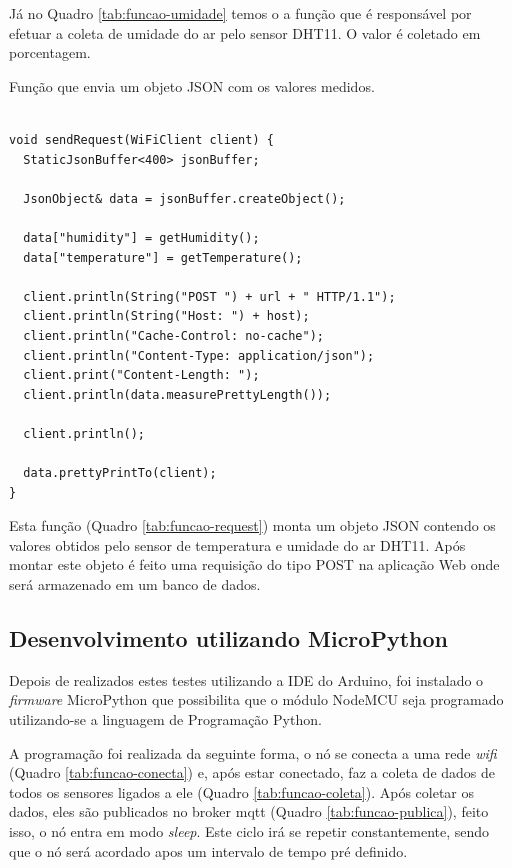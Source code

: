 Já no Quadro \ref{tab:funcao-umidade} temos o a função que é responsável por efetuar a coleta de umidade do ar pelo sensor DHT11. O valor é coletado em porcentagem.

\begin{quadro}[H]
\centering
\caption{Função que envia um objeto JSON com os valores medidos.}
\vspace{-\baselineskip}
\begin{verbatim}

void sendRequest(WiFiClient client) {
  StaticJsonBuffer<400> jsonBuffer;

  JsonObject& data = jsonBuffer.createObject();

  data["humidity"] = getHumidity();
  data["temperature"] = getTemperature();

  client.println(String("POST ") + url + " HTTP/1.1");
  client.println(String("Host: ") + host);
  client.println("Cache-Control: no-cache");
  client.println("Content-Type: application/json");
  client.print("Content-Length: ");
  client.println(data.measurePrettyLength());

  client.println();

  data.prettyPrintTo(client);
}
\end{verbatim}
\vspace{-1.2cm}
\label{tab:funcao-request}
\end{quadro}

Esta função (Quadro \ref{tab:funcao-request}) monta um objeto JSON contendo os valores obtidos pelo sensor de temperatura e umidade do ar DHT11. Após montar este objeto é feito uma requisição do tipo POST na aplicação Web onde será armazenado em um banco de dados.

\subsection{Desenvolvimento utilizando MicroPython}

Depois de realizados estes testes utilizando a IDE do Arduino, foi instalado o \textit{firmware} MicroPython que possibilita que o módulo NodeMCU seja programado utilizando-se a linguagem de Programação Python.

A programação foi realizada da seguinte forma, o nó se conecta a uma rede \textit{wifi} (Quadro \ref{tab:funcao-conecta}) e, após estar conectado, faz a coleta de dados de todos os sensores ligados a ele (Quadro \ref{tab:funcao-coleta}). Após coletar os dados, eles são publicados no broker mqtt (Quadro \ref{tab:funcao-publica}), feito isso, o nó entra em modo \textit{sleep}. Este ciclo irá se repetir constantemente, sendo que o nó será acordado apos um intervalo de tempo pré definido.

